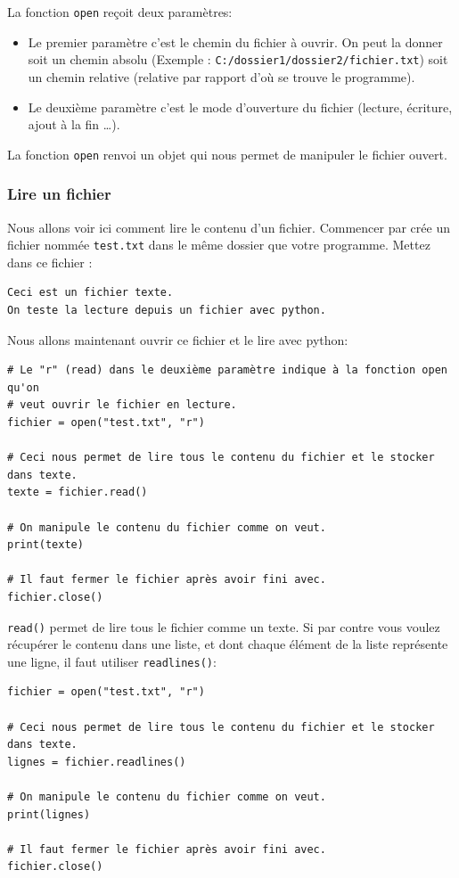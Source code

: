 \documentclass[12pt]{article}
\newcommand{\code}[1]{\colorbox{light-gray}{\texttt{#1}}}
\begin{document}
        La fonction \code{open} reçoit deux paramètres: 
        \begin{itemize}
            \item Le premier paramètre c'est le chemin du fichier à ouvrir. On peut la donner soit 
            un chemin absolu (Exemple : \code{C:/dossier1/dossier2/fichier.txt}) soit un chemin relative
            (relative par rapport d'où se trouve le programme).
            \item Le deuxième paramètre c'est le mode d'ouverture du fichier (lecture, écriture,
            ajout à la fin \dots).
        \end{itemize}

        La fonction \code{open} renvoi un objet qui nous permet de manipuler le fichier ouvert.

        \subsubsection{Lire un fichier}
        Nous allons voir ici comment lire le contenu d'un fichier. Commencer par crée un fichier 
        nommée \code{test.txt} dans le même dossier que votre programme. Mettez dans ce fichier :
        \begin{lstlisting}[style=exec_result]
Ceci est un fichier texte.
On teste la lecture depuis un fichier avec python.
        \end{lstlisting}

        Nous allons maintenant ouvrir ce fichier et le lire avec python:
        \begin{lstlisting}[style=code]
# Le "r" (read) dans le deuxième paramètre indique à la fonction open qu'on 
# veut ouvrir le fichier en lecture.
fichier = open("test.txt", "r")

# Ceci nous permet de lire tous le contenu du fichier et le stocker dans texte.
texte = fichier.read()

# On manipule le contenu du fichier comme on veut.
print(texte)

# Il faut fermer le fichier après avoir fini avec.
fichier.close()
        \end{lstlisting}

        \code{read()} permet de lire tous le fichier comme un texte. Si par contre vous voulez
        récupérer le contenu dans une liste, et dont chaque élément de la liste représente une ligne,
        il faut utiliser \code{readlines()}:
        \begin{lstlisting}[style=code]
fichier = open("test.txt", "r")

# Ceci nous permet de lire tous le contenu du fichier et le stocker dans texte.
lignes = fichier.readlines()

# On manipule le contenu du fichier comme on veut.
print(lignes)

# Il faut fermer le fichier après avoir fini avec.
fichier.close()
        \end{lstlisting}
\end{document}
